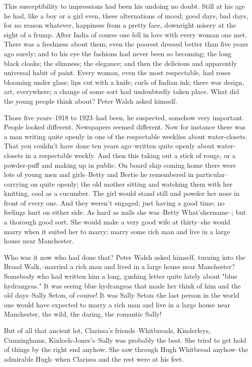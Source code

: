 \documentclass[lang=cn,10pt]{elegantbook}
\begin{document}
This susceptibility to impressions had been his undoing no doubt.
Still at his age he had, like a boy or a girl even, these
alternations of mood; good days, bad days, for no reason whatever,
happiness from a pretty face, downright misery at the sight of a
frump.  After India of course one fell in love with every woman one
met.  There was a freshness about them; even the poorest dressed
better than five years ago surely; and to his eye the fashions had
never been so becoming; the long black cloaks; the slimness; the
elegance; and then the delicious and apparently universal habit of
paint.  Every woman, even the most respectable, had roses blooming
under glass; lips cut with a knife; curls of Indian ink; there was
design, art, everywhere; a change of some sort had undoubtedly
taken place.  What did the young people think about? Peter Walsh
asked himself.

Those five years--1918 to 1923--had been, he suspected, somehow
very important.  People looked different.  Newspapers seemed
different.  Now for instance there was a man writing quite openly
in one of the respectable weeklies about water-closets.  That you
couldn't have done ten years ago--written quite openly about water-
closets in a respectable weekly.  And then this taking out a stick
of rouge, or a powder-puff and making up in public.  On board ship
coming home there were lots of young men and girls--Betty and
Bertie he remembered in particular--carrying on quite openly; the
old mother sitting and watching them with her knitting, cool as a
cucumber.  The girl would stand still and powder her nose in front
of every one.  And they weren't engaged; just having a good time;
no feelings hurt on either side.  As hard as nails she was--Betty
What'shername--; but a thorough good sort.  She would make a very
good wife at thirty--she would marry when it suited her to marry;
marry some rich man and live in a large house near Manchester.

Who was it now who had done that?  Peter Walsh asked himself,
turning into the Broad Walk,--married a rich man and lived in a
large house near Manchester?  Somebody who had written him a long,
gushing letter quite lately about "blue hydrangeas."  It was seeing
blue hydrangeas that made her think of him and the old days--Sally
Seton, of course!  It was Sally Seton--the last person in the world
one would have expected to marry a rich man and live in a large
house near Manchester, the wild, the daring, the romantic Sally!

But of all that ancient lot, Clarissa's friends--Whitbreads,
Kinderleys, Cunninghams, Kinloch-Jones's--Sally was probably the
best.  She tried to get hold of things by the right end anyhow.
She saw through Hugh Whitbread anyhow--the admirable Hugh--when
Clarissa and the rest were at his feet.
\end{document}
